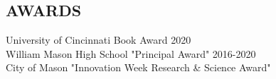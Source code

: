 \documentclass[margin, 10pt]{res} %
\begin{document}
\begin{resume}

\section{AWARDS}

University of Cincinnati Book Award 2020 \\
William Mason High School "Principal Award" 2016-2020 \\
City of Mason "Innovation Week Research \& Science Award"


\end{resume}
\end{document}
